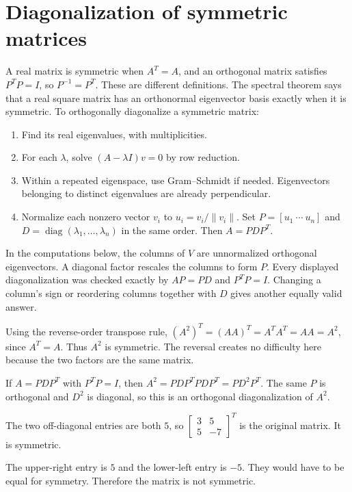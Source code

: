 \section{Diagonalization of symmetric matrices}
A real matrix is symmetric when $A^T=A$, and an orthogonal matrix satisfies
$P^TP=I$, so $P^{-1}=P^T$. These are different definitions.
The spectral theorem says that a real square matrix has an orthonormal
eigenvector basis exactly when it is symmetric.
To orthogonally diagonalize a symmetric matrix:
\begin{enumerate}
\item Find its real eigenvalues, with multiplicities.
\item For each $\lambda$, solve $(A-\lambda I)v=0$ by row reduction.
\item Within a repeated eigenspace, use Gram--Schmidt if needed.
Eigenvectors belonging to distinct eigenvalues are already perpendicular.
\item Normalize each nonzero vector $v_i$ to $u_i=v_i/\|v_i\|$.
Set $P=[u_1\ \cdots\ u_n]$ and $D=\operatorname{diag}(\lambda_1,\ldots,\lambda_n)$
in the same order. Then $A=PDP^T$.
\end{enumerate}
In the computations below, the columns of $V$ are unnormalized orthogonal
eigenvectors. A diagonal factor rescales the columns to form $P$.
Every displayed diagonalization was checked exactly by $AP=PD$ and $P^TP=I$.
Changing a column's sign or reordering columns together with $D$ gives
another equally valid answer.

Using the reverse-order transpose rule,
$(A^2)^T=(AA)^T=A^TA^T=AA=A^2$, since $A^T=A$.
Thus $A^2$ is symmetric. The reversal creates no difficulty here because
the two factors are the same matrix.

If $A=PDP^T$ with $P^TP=I$, then
$A^2=PDP^TPDP^T=PD^2P^T$.
The same $P$ is orthogonal and $D^2$ is diagonal, so this is an orthogonal
diagonalization of $A^2$.

The two off-diagonal entries are both $5$, so
$\begin{bmatrix}3&5\\5&-7\end{bmatrix}^T$
is the original matrix. It is symmetric.

The upper-right entry is $5$ and the lower-left entry is $-5$.
They would have to be equal for symmetry. Therefore the matrix is not symmetric.

